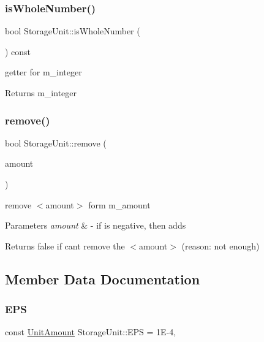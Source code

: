 \subsubsection{\texorpdfstring{is\+Whole\+Number()}{isWholeNumber()}}
{\footnotesize\ttfamily bool Storage\+Unit\+::is\+Whole\+Number (\begin{DoxyParamCaption}{ }\end{DoxyParamCaption}) const}

getter for m\+\_\+integer \begin{DoxyReturn}{Returns}
m\+\_\+integer 
\end{DoxyReturn}
\mbox{\label{classStorageUnit_a790ca821c741cdf98d83d10ee68fe7e4}} 
\subsubsection{\texorpdfstring{remove()}{remove()}}
{\footnotesize\ttfamily bool Storage\+Unit\+::remove (\begin{DoxyParamCaption}\item[{const \hyperlink{StorageUnit_8hpp_a13b2ba6b0400e1aa0b57282bd1228f20}{Unit\+Amount}}]{amount }\end{DoxyParamCaption})}

remove $<$amount$>$ form m\+\_\+amount 
\begin{DoxyParams}{Parameters}
{\em amount} & -\/ if is negative, then adds \\
\hline
\end{DoxyParams}
\begin{DoxyReturn}{Returns}
false if can\textquotesingle{}t remove the $<$amount$>$ (reason\+: not enough) 
\end{DoxyReturn}


\subsection{Member Data Documentation}
\mbox{\label{classStorageUnit_af43ba3a77fda788aae3a6b2065d590a3}} 
\subsubsection{\texorpdfstring{E\+PS}{EPS}}
{\footnotesize\ttfamily const \hyperlink{StorageUnit_8hpp_a13b2ba6b0400e1aa0b57282bd1228f20}{Unit\+Amount} Storage\+Unit\+::\+E\+PS = 1\+E-\/4\hspace{0.3cm}{\ttfamily [static]}, {\ttfamily [private]}}

